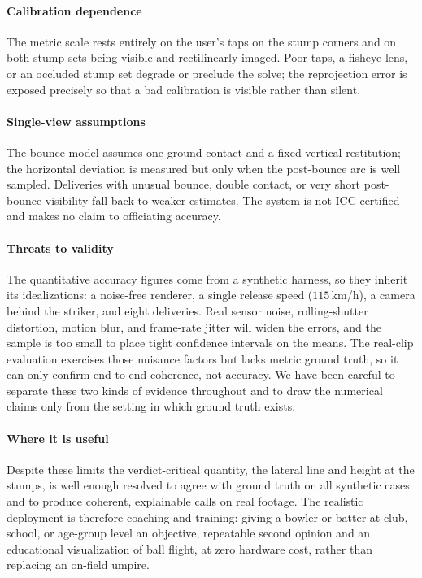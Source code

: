 \documentclass[journal]{IEEEtran}
\begin{document}
\paragraph*{Calibration dependence} The metric scale rests entirely on the
user's taps on the stump corners and on both stump sets being visible and
rectilinearly imaged. Poor taps, a fisheye lens, or an occluded stump set
degrade or preclude the solve; the reprojection error is exposed precisely so
that a bad calibration is visible rather than silent.

\paragraph*{Single-view assumptions} The bounce model assumes one ground
contact and a fixed vertical restitution; the horizontal deviation is measured
but only when the post-bounce arc is well sampled. Deliveries with unusual
bounce, double contact, or very short post-bounce visibility fall back to weaker
estimates. The system is not ICC-certified and makes no claim to officiating
accuracy.

\paragraph*{Threats to validity} The quantitative accuracy figures come from a
synthetic harness, so they inherit its idealizations: a noise-free renderer, a
single release speed ($115$\,km/h), a camera behind the striker, and eight
deliveries. Real sensor noise, rolling-shutter distortion, motion blur, and
frame-rate jitter will widen the errors, and the sample is too small to place
tight confidence intervals on the means. The real-clip evaluation exercises
those nuisance factors but lacks metric ground truth, so it can only confirm
end-to-end coherence, not accuracy. We have been careful to separate these two
kinds of evidence throughout and to draw the numerical claims only from the
setting in which ground truth exists.

\paragraph*{Where it is useful} Despite these limits the verdict-critical
quantity, the lateral line and height at the stumps, is well enough resolved
to agree with ground truth on all synthetic cases and to produce coherent,
explainable calls on real footage. The realistic deployment is therefore
coaching and training: giving a bowler or batter at club, school, or age-group
level an objective, repeatable second opinion and an educational visualization
of ball flight, at zero hardware cost, rather than replacing an on-field umpire.
\end{document}
